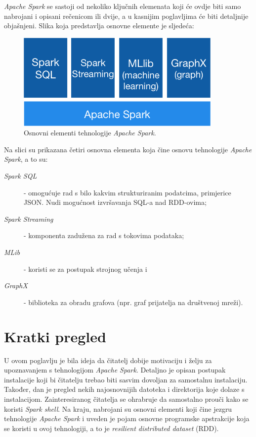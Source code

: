 \documentclass[times, utf8, zavrsni]{fer}
\begin{document}
\emph{Apache Spark} se sastoji od nekoliko ključnih elemenata koji će ovdje biti samo nabrojani i opisani rečenicom ili dvije, a u kasnijim poglavljima će biti detaljnije objašnjeni. Slika koja predstavlja osnovne elemente je sljedeća: 
\begin{figure}[htb]
\centering
\includegraphics[width=10cm]{img/spark-stack.png}
\caption{Osnovni elementi tehnologije \emph{Apache Spark}.}
\label{fig:spark-stack}
\end{figure}

Na slici su prikazana četiri osnovna elementa koja čine osnovu tehnologije \emph{Apache Spark}, a to su: 
\begin{description}
\item[\emph{Spark SQL}] - omogućuje rad s bilo kakvim strukturiranim podatcima, primjerice JSON. Nudi mogućnost izvršavanja SQL-a nad RDD-ovima;
\item[\emph{Spark Streaming}] - komponenta zadužena za rad s tokovima podataka;
\item[\emph{MLib}] - koristi se za postupak strojnog učenja i 
\item[\emph{GraphX}] - biblioteka za obradu grafova (npr. graf prijatelja na društvenoj mreži).
\end{description}

\section{Kratki pregled}
U ovom poglavlju je bila ideja da čitatelj dobije motivaciju i želju za upoznavanjem s tehnologijom \emph{Apache Spark}. Detaljno je opisan postupak instalacije koji bi čitatelju trebao biti sasvim dovoljan za samostalnu instalaciju. Također, dan je pregled nekih najosnovnijih datoteka i direktorija koje dolaze s instalacijom. Zainteresiranog čitatelja se ohrabruje da samostalno prouči kako se koristi \emph{Spark shell}. Na kraju, nabrojani su osnovni elementi koji čine jezgru tehnologije \emph{Apache Spark} i uveden je pojam osnovne programske apstrakcije koja se koristi u ovoj tehnologiji, a to je \emph{resilient distributed dataset} (RDD).
\end{document}
